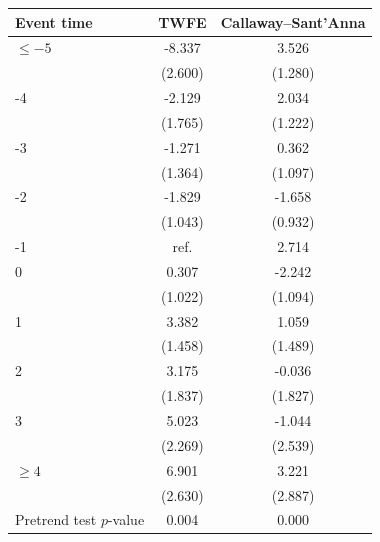 \begin{tabular}{lcc}
\toprule
Event time & TWFE & Callaway--Sant'Anna \\
\midrule
\(\le -5\) & -8.337 &  3.526 \\
 & (2.600) & (1.280) \\
-4 & -2.129 &  2.034 \\
 & (1.765) & (1.222) \\
-3 & -1.271 &  0.362 \\
 & (1.364) & (1.097) \\
-2 & -1.829 & -1.658 \\
 & (1.043) & (0.932) \\
-1 & \multicolumn{1}{c}{ref.} &  2.714 \\
0 &  0.307 & -2.242 \\
 & (1.022) & (1.094) \\
1 &  3.382 &  1.059 \\
 & (1.458) & (1.489) \\
2 &  3.175 & -0.036 \\
 & (1.837) & (1.827) \\
3 &  5.023 & -1.044 \\
 & (2.269) & (2.539) \\
\(\ge 4\) &  6.901 &  3.221 \\
 & (2.630) & (2.887) \\
\midrule
Pretrend test \(p\)-value & 0.004 & 0.000 \\
\bottomrule
\end{tabular}
